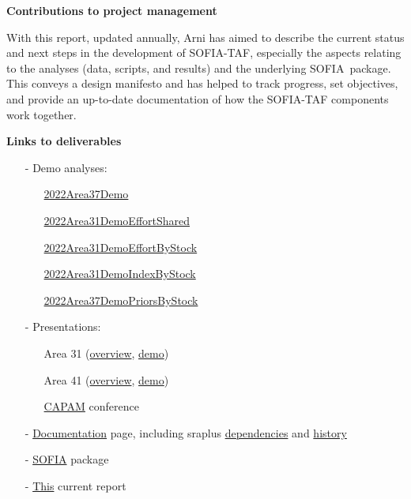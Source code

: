 \documentclass[12pt]{article}
\newcommand\blue[1]{\textcolor{darkblue}{#1}}
\newcommand\SOFIA{{\sf SOFIA}}
\newcommand\sofialink[2]{\blue{\href{https://github.com/sofia-taf/#1}{\sf #2}}}
\begin{document}
\textbf{Contributions to project management}

With this report, updated annually, Arni has aimed to describe the current
status and next steps in the development of SOFIA-TAF, especially the aspects
relating to the analyses (data, scripts, and results) and the underlying \SOFIA\
package. This conveys a design manifesto and has helped to track progress, set
objectives, and provide an up-to-date documentation of how the SOFIA-TAF
components work together.

\newpage

\textbf{Links to deliverables}

\begin{itemize}
  \item[-] Demo analyses:\\[-3.5ex]
  \begin{itemize}
    \item[] \sofialink{2022Area37Demo}{2022Area37Demo}\\[-4ex]
    \item[] \sofialink{2022Area31DemoEffortShared}
    {2022Area31DemoEffortShared}\\[-4ex]
    \item[] \sofialink{2022Area31DemoEffortByStock}
    {2022Area31DemoEffortByStock}\\[-4ex]
    \item[] \sofialink{2022Area31DemoIndexByStock}
    {2022Area31DemoIndexByStock}\\[-4ex]
    \item[] \sofialink{2022Area37DemoPriorsByStock}
    {2022Area37DemoPriorsByStock}\\[-3ex]
  \end{itemize}
  \item[-] Presentations:\\[-3.5ex]
  \begin{itemize}
    \item[] Area 31
    (\sofialink{doc/blob/main/presentations/area_31/overview.pdf}{overview},
    \sofialink{doc/blob/main/presentations/area_31/demo.pdf}{demo})\\[-4ex]
    \item[] Area 41
    (\sofialink{doc/blob/main/presentations/area_41/overview.pdf}{overview},
    \sofialink{doc/blob/main/presentations/area_41/demo.pdf}{demo})\\[-4ex]
    \item[] \sofialink{doc/blob/main/presentations/capam/open_reproducible.pdf}
    {CAPAM} conference\\[-3ex]
  \end{itemize}
  \item[-] \sofialink{doc}{Documentation} page, including sraplus
  \sofialink{doc/blob/main/sraplus_dependencies.md}{dependencies} and
  \sofialink{doc/blob/main/sraplus_history.md}{history}\\[-3ex]
  \item[-] \sofialink{SOFIA}{SOFIA} package\\[-3ex]
  \item[-] \blue{\href{https://arni-magnusson.github.io/pdf/2022-sofia-taf.pdf}
    {{\sf This}}} current report
\end{itemize}
\end{document}
